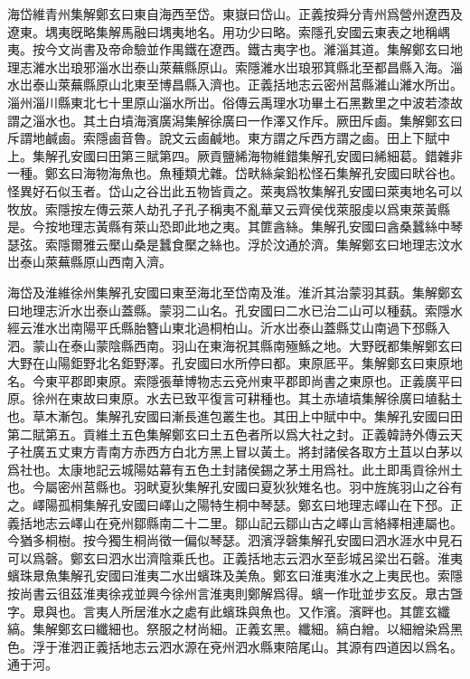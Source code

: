 海岱維青州集解鄭玄曰東自海西至岱。東嶽曰岱山。正義按舜分青州爲營州遼西及遼東。堣夷旣略集解馬融曰堣夷地名。用功少曰略。索隱孔安國云東表之地稱嵎夷。按今文尚書及帝命驗並作禺鐵在遼西。鐵古夷字也。濰淄其道。集解鄭玄曰地理志濰水岀琅邪淄水岀泰山萊蕪縣原山。索隱濰水岀琅邪箕縣北至都昌縣入海。淄水岀泰山萊蕪縣原山北東至博昌縣入濟也。正義括地志云密州莒縣濰山濰水所岀。淄州淄川縣東北七十里原山淄水所岀。俗傳云禹理水功畢土石黑數里之中波若漆故謂之淄水也。其土白墳海濱廣潟集解徐廣曰一作澤又作斥。厥田斥鹵。集解鄭玄曰斥謂地鹹鹵。索隱鹵音魯。說文云鹵鹹地。東方謂之斥西方謂之鹵。田上下賦中上。集解孔安國曰田第三賦第四。厥貢鹽絺海物維錯集解孔安國曰絺細葛。錯雜非一種。鄭玄曰海物海魚也。魚種類尤雜。岱畎絲枲鉛松怪石集解孔安國曰畎谷也。怪異好石似玉者。岱山之谷岀此五物皆貢之。萊夷爲牧集解孔安國曰萊夷地名可以牧放。索隱按左傳云萊人劫孔子孔子稱夷不亂華又云齊侯伐萊服虔以爲東萊黃縣是。今按地理志黃縣有萊山恐即此地之夷。其篚酓絲。集解孔安國曰酓桑蠶絲中琴瑟弦。索隱爾雅云檿山桑是蠶食檿之絲也。浮於汶通於濟。集解鄭玄曰地理志汶水岀泰山萊蕪縣原山西南入濟。

海岱及淮維徐州集解孔安國曰東至海北至岱南及淮。淮沂其治蒙羽其蓺。集解鄭玄曰地理志沂水岀泰山蓋縣。蒙羽二山名。孔安國曰二水已治二山可以種蓺。索隱水經云淮水岀南陽平氏縣胎簪山東北過桐柏山。沂水岀泰山蓋縣艾山南過下邳縣入泗。蒙山在泰山蒙陰縣西南。羽山在東海祝其縣南殛鯀之地。大野旣都集解鄭玄曰大野在山陽鉅野北名鉅野澤。孔安國曰水所停曰都。東原厎平。集解鄭玄曰東原地名。今東平郡即東原。索隱張華博物志云兗州東平郡即尚書之東原也。正義廣平曰原。徐州在東故曰東原。水去已致平復言可耕種也。其土赤埴墳集解徐廣曰埴黏土也。草木漸包。集解孔安國曰漸長進包叢生也。其田上中賦中中。集解孔安國曰田第二賦第五。貢維土五色集解鄭玄曰土五色者所以爲大社之封。正義韓詩外傳云天子社廣五丈東方青南方赤西方白北方黑上冒以黃土。將封諸侯各取方土苴以白茅以爲社也。太康地記云城陽姑幕有五色土封諸侯錫之茅土用爲社。此土即禹貢徐州土也。今屬密州莒縣也。羽畎夏狄集解孔安國曰夏狄狄雉名也。羽中旌旄羽山之谷有之。嶧陽孤桐集解孔安國曰嶧山之陽特生桐中琴瑟。鄭玄曰地理志嶧山在下邳。正義括地志云嶧山在兗州鄒縣南二十二里。鄒山記云鄒山古之嶧山言絡繹相連屬也。今猶多桐樹。按今獨生桐尚徵一偏似琴瑟。泗濱浮磬集解孔安國曰泗水涯水中見石可以爲磬。鄭玄曰泗水岀濟陰乘氏也。正義括地志云泗水至彭城呂梁岀石磬。淮夷蠙珠臮魚集解孔安國曰淮夷二水岀蠙珠及美魚。鄭玄曰淮夷淮水之上夷民也。索隱按尚書云徂茲淮夷徐戎並興今徐州言淮夷則鄭解爲得。蠙一作玭並步玄反。臮古曁字。臮與也。言夷人所居淮水之處有此蠙珠與魚也。又作濱。濱畔也。其篚玄纖縞。集解鄭玄曰纖細也。祭服之材尚細。正義玄黑。纖細。縞白繒。以細繒染爲黑色。浮于淮泗正義括地志云泗水源在兗州泗水縣東陪尾山。其源有四道因以爲名。通于河。

